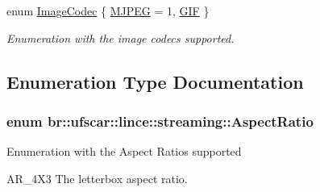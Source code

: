 \begin{DoxyCompactItemize}
\begin{DoxyCompactList}
\begin{DoxyItemize}
\end{DoxyItemize}\item\end{DoxyCompactList}\item 
enum \hyperlink{namespacebr_1_1ufscar_1_1lince_1_1streaming_aeaf227c1caf3369cc7c90188dac89494}{ImageCodec} \{ \hyperlink{namespacebr_1_1ufscar_1_1lince_1_1streaming_aeaf227c1caf3369cc7c90188dac89494a725778b4be9420918835aed7b3b40a15}{MJPEG} = 1, 
\hyperlink{namespacebr_1_1ufscar_1_1lince_1_1streaming_aeaf227c1caf3369cc7c90188dac89494ae8496950dab18f2f5d0c311d48238368}{GIF}
 \}
\begin{DoxyCompactList}\small\item\em Enumeration with the image codecs supported. \item\end{DoxyCompactList}\end{DoxyCompactItemize}


\subsection{Enumeration Type Documentation}
\hypertarget{namespacebr_1_1ufscar_1_1lince_1_1streaming_a4b30a3170430e0fc8bacd10d9c602bb8}{
\subsubsection[{AspectRatio}]{\setlength{\rightskip}{0pt plus 5cm}enum {\bf br::ufscar::lince::streaming::AspectRatio}}}
\label{namespacebr_1_1ufscar_1_1lince_1_1streaming_a4b30a3170430e0fc8bacd10d9c602bb8}


Enumeration with the Aspect Ratios supported
\begin{DoxyItemize}
\item AR\_\-4X3 The letterbox aspect ratio. 
\end{DoxyItemize}


